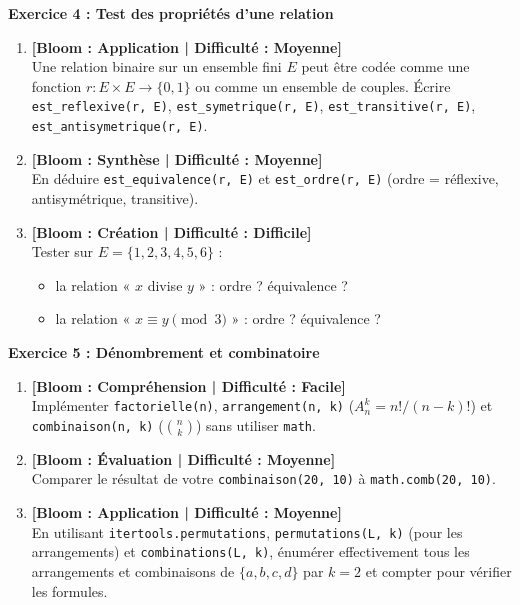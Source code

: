 \documentclass[12pt,a4paper]{report}
\begin{document}
\vspace{0.3cm}

\noindent\textbf{Exercice 4 : Test des propriétés d'une relation}
\begin{enumerate}
    \item \textbf{[Bloom : Application | Difficulté : Moyenne]} \\
    Une relation binaire sur un ensemble fini $E$ peut être codée comme une fonction $r : E \times E \to \{0, 1\}$ ou comme un ensemble de couples. Écrire \texttt{est\_reflexive(r, E)}, \texttt{est\_symetrique(r, E)}, \texttt{est\_transitive(r, E)}, \texttt{est\_antisymetrique(r, E)}.
    \item \textbf{[Bloom : Synthèse | Difficulté : Moyenne]} \\
    En déduire \texttt{est\_equivalence(r, E)} et \texttt{est\_ordre(r, E)} (ordre = réflexive, antisymétrique, transitive).
    \item \textbf{[Bloom : Création | Difficulté : Difficile]} \\
    Tester sur $E = \{1, 2, 3, 4, 5, 6\}$ :
    \begin{itemize}
        \item la relation « $x$ divise $y$ » : ordre ? équivalence ?
        \item la relation « $x \equiv y \pmod{3}$ » : ordre ? équivalence ?
    \end{itemize}
\end{enumerate}

\vspace{0.3cm}

\noindent\textbf{Exercice 5 : Dénombrement et combinatoire}
\begin{enumerate}
    \item \textbf{[Bloom : Compréhension | Difficulté : Facile]} \\
    Implémenter \texttt{factorielle(n)}, \texttt{arrangement(n, k)} ($A_n^k = n!/(n-k)!$) et \texttt{combinaison(n, k)} ($\binom{n}{k}$) sans utiliser \texttt{math}.
    \item \textbf{[Bloom : Évaluation | Difficulté : Moyenne]} \\
    Comparer le résultat de votre \texttt{combinaison(20, 10)} à \texttt{math.comb(20, 10)}.
    \item \textbf{[Bloom : Application | Difficulté : Moyenne]} \\
    En utilisant \texttt{itertools.permutations}, \texttt{permutations(L, k)} (pour les arrangements) et \texttt{combinations(L, k)}, énumérer effectivement tous les arrangements et combinaisons de $\{a, b, c, d\}$ par $k = 2$ et compter pour vérifier les formules.
\end{enumerate}
\end{document}
